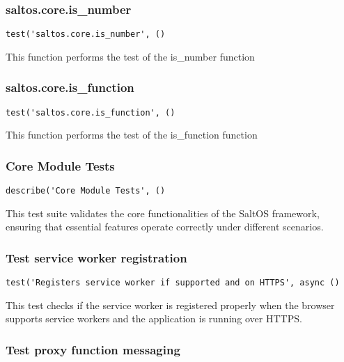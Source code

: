 \documentclass[a4paper]{article}
\begin{document}
\subsubsection{saltos.core.is\_number}

\begin{lstlisting}
test('saltos.core.is_number', ()
\end{lstlisting}

This function performs the test of the is\_number function

\hypertarget{toc102}{}
\subsubsection{saltos.core.is\_function}

\begin{lstlisting}
test('saltos.core.is_function', ()
\end{lstlisting}

This function performs the test of the is\_function function

\hypertarget{toc103}{}
\subsubsection{Core Module Tests}

\begin{lstlisting}
describe('Core Module Tests', ()
\end{lstlisting}

This test suite validates the core functionalities of the SaltOS framework,
ensuring that essential features operate correctly under different scenarios.

\hypertarget{toc104}{}
\subsubsection{Test service worker registration}

\begin{lstlisting}
test('Registers service worker if supported and on HTTPS', async ()
\end{lstlisting}

This test checks if the service worker is registered properly when the
browser supports service workers and the application is running over HTTPS.

\hypertarget{toc105}{}
\subsubsection{Test proxy function messaging}
\end{document}
